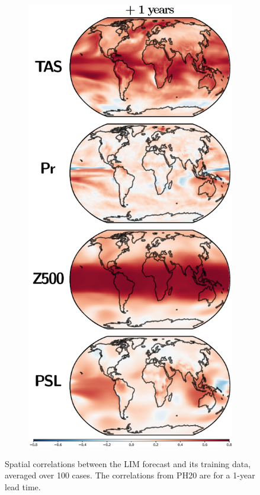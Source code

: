 \documentclass[parskip=half,DIV=16]{scrartcl}
\begin{document}
\begin{figure}[h]
\begin{subfigure}[c]{0.22\textwidth}
        \includegraphics[width=\textwidth]{figures/corr_spatial_ph20.png}
        \label{fig:corr-spatial-ph}
     \end{subfigure}
    \caption{Spatial correlations between the LIM forecast and its training data, averaged over 100 cases. The correlations from PH20 are for a 1-year lead time.}
    \label{fig:corr-spatial}
\end{figure}
\end{document}
